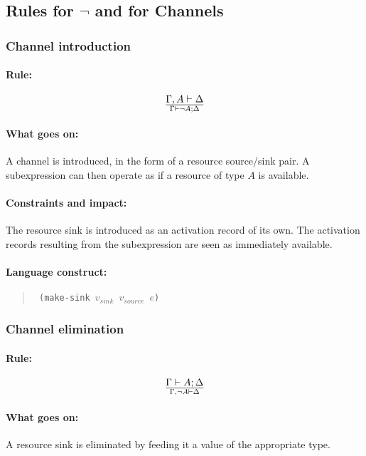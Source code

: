 \documentclass[a4paper]{article}
\begin{document}

\subsection{Rules for $\lnot$ and for Channels}

\subsubsection{Channel introduction}

\paragraph{Rule:}
$$
{
  \Gamma, A \vdash \Delta
}\over{
  \Gamma \vdash \lnot A; \Delta
}
$$

\paragraph{What goes on:} A channel is introduced, in the form of a
resource source/sink pair. A subexpression can then operate as if a
resource of type $A$ is available.

\paragraph{Constraints and impact:} The resource sink is introduced as
an activation record of its own. The activation records resulting from
the subexpression are seen as immediately available.

\paragraph{Language construct:}
\begin{quote}\tt
  (make-sink $v_{sink}$ $v_{source}$ $e$)
\end{quote}

\subsubsection{Channel elimination}
\paragraph{Rule:}
$$
{
  \Gamma \vdash A; \Delta
}\over{
  \Gamma, \lnot A \vdash \Delta
}
$$

\paragraph{What goes on:} A resource sink is eliminated by feeding it
a value of the appropriate type.
\end{document}
